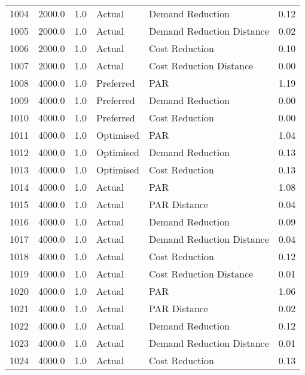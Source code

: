 \begin{longtable}{lrrllr}
1004 &       2000.0 &     1.0 &         Actual &           Demand Reduction &   0.12 \\
1005 &       2000.0 &     1.0 &         Actual &  Demand Reduction Distance &   0.02 \\
1006 &       2000.0 &     1.0 &         Actual &             Cost Reduction &   0.10 \\
1007 &       2000.0 &     1.0 &         Actual &    Cost Reduction Distance &   0.00 \\
1008 &       4000.0 &     1.0 &      Preferred &                        PAR &   1.19 \\
1009 &       4000.0 &     1.0 &      Preferred &           Demand Reduction &   0.00 \\
1010 &       4000.0 &     1.0 &      Preferred &             Cost Reduction &   0.00 \\
1011 &       4000.0 &     1.0 &      Optimised &                        PAR &   1.04 \\
1012 &       4000.0 &     1.0 &      Optimised &           Demand Reduction &   0.13 \\
1013 &       4000.0 &     1.0 &      Optimised &             Cost Reduction &   0.13 \\
1014 &       4000.0 &     1.0 &         Actual &                        PAR &   1.08 \\
1015 &       4000.0 &     1.0 &         Actual &               PAR Distance &   0.04 \\
1016 &       4000.0 &     1.0 &         Actual &           Demand Reduction &   0.09 \\
1017 &       4000.0 &     1.0 &         Actual &  Demand Reduction Distance &   0.04 \\
1018 &       4000.0 &     1.0 &         Actual &             Cost Reduction &   0.12 \\
1019 &       4000.0 &     1.0 &         Actual &    Cost Reduction Distance &   0.01 \\
1020 &       4000.0 &     1.0 &         Actual &                        PAR &   1.06 \\
1021 &       4000.0 &     1.0 &         Actual &               PAR Distance &   0.02 \\
1022 &       4000.0 &     1.0 &         Actual &           Demand Reduction &   0.12 \\
1023 &       4000.0 &     1.0 &         Actual &  Demand Reduction Distance &   0.01 \\
1024 &       4000.0 &     1.0 &         Actual &             Cost Reduction &   0.13 \\

\end{longtable}
